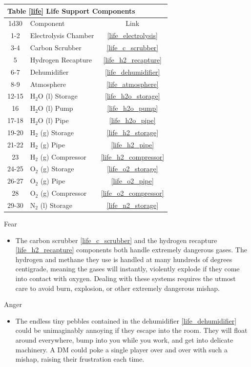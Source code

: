 \documentclass[a4paper]{article}
\begin{document}
\vspace{0.5cm} \hspace{0.25\linewidth}
\def\life_components{
\begin{tabular}[t]{@{} | c | l | c | @{}}
\toprule
\multicolumn{3}{|l|}{Table \ref{life} Life Support Components} \\
\toprule
1d30 & Component & Link \\
\midrule
1-2 & Electrolysis Chamber & \ref{life_electrolysis} \\
3-4 & Carbon Scrubber & \ref{life_c_scrubber} \\
5 & Hydrogen Recapture & \ref{life_h2_recapture} \\
6-7 & Dehumidifier & \ref{life_dehumidifier} \\
8-9 & Atmosphere & \ref{life_atmosphere} \\
\midrule
12-15 & H$_2$O (l) Storage & \ref{life_h2o_storage} \\
16 & H$_2$O (l) Pump & \ref{life_h2o_pump} \\
17-18 & H$_2$O (l) Pipe & \ref{life_h2o_pipe} \\
19-20 & H$_2$ (g) Storage & \ref{life_h2_storage} \\
21-22 & H$_2$ (g) Pipe & \ref{life_h2_pipe} \\
23 & H$_2$ (g) Compressor & \ref{life_h2_compressor} \\
24-25 & O$_2$ (g) Storage & \ref{life_o2_storage} \\
26-27 & O$_2$ (g) Pipe & \ref{life_o2_pipe} \\
28 & O$_2$ (g) Compressor & \ref{life_o2_compressor} \\
29-30 & N$_2$ (l) Storage & \ref{life_n2_storage} \\
\bottomrule
\end{tabular}
}
\life_components

\vspace{0.3cm}
\begin{minipage}[t]{0.4\linewidth}
Fear
\begin{itemize}
\item The carbon scrubber \ref{life_c_scrubber} and the hydrogen recapture \ref{life_h2_recapture} components both handle extremely dangerous gases. The hydrogen and methane they use is handled at many hundreds of degrees centigrade, meaning the gases will instantly, violently explode if they come into contact with oxygen. Dealing with these systems requires the utmost care to avoid burn, explosion, or other extremely dangerous mishap.
\end{itemize}
\end{minipage} 
\begin{minipage}[t]{0.4\linewidth}
Anger
\begin{itemize}
\item The endless tiny pebbles contained in the dehumidifier \ref{life_dehumidifier} could be unimaginably annoying if they escape into the room. They will float around everywhere, bump into you while you work, and get into delicate machinery. A DM could poke a single player over and over with such a mishap, raising their frustration each time.
\end{itemize}
\end{minipage}
\end{document}

